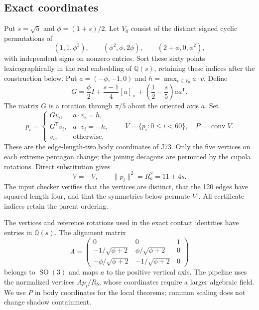 \documentclass[11pt]{amsart}
\newcommand{\Q}{\mathbb Q}
\newcommand{\SO}{\operatorname{SO}}
\newcommand{\conv}{\operatorname{conv}}
\newcommand{\norm}[1]{\lVert#1\rVert}
\newcommand{\cross}[1]{[#1]_\times}
\theoremstyle{definition}
\theoremstyle{remark}
\begin{document}
\subsection{Exact coordinates}
Put $s=\sqrt5$ and $\phi=(1+s)/2$. Let $V_0$ consist of the distinct signed
cyclic permutations of
\begin{equation}\label{eq:seeds}
 (1,1,\phi^3),\qquad (\phi^2,\phi,2\phi),\qquad
 (2+\phi,0,\phi^2),
\end{equation}
with independent signs on nonzero entries. Sort these sixty points
lexicographically in the real embedding of $\Q(s)$, retaining these
indices after the construction below. Put $a=(-\phi,-1,0)$ and
$h=\max_{v\in V_0}a\cdot v$. Define
\begin{equation}\label{eq:gyration}
 G=\frac\phi2 I+\frac{s-1}{4}\cross a
       +\left(\frac12-\frac{s}{5}\right)aa^{\mathsf T}.
\end{equation}
The matrix $G$ is a rotation through $\pi/5$ about the oriented axis $a$. Set
\begin{equation}\label{eq:body}
 p_i=\begin{cases}
 Gv_i,&a\cdot v_i=h,\\
 G^{\mathsf T}v_i,&a\cdot v_i=-h,\\
 v_i,&\text{otherwise},
 \end{cases}
 \qquad V=\{p_i:0\le i<60\},\quad P=\conv V.
\end{equation}
These are the edge-length-two body coordinates of J73. Only the five
vertices on each extreme pentagon change; the joining decagons are
permuted by the cupola rotations. Direct substitution gives
\begin{equation}\label{eq:bodychecks}
 V=-V,\qquad \norm{p_i}^2=R_b^2=11+4s.
\end{equation}
The input checker verifies that the vertices are distinct, that the 120
edges have squared length four, and that the symmetries below permute
$V$ \cite{input}. All certificate indices retain the parent ordering.

The vertices and reference rotations used in the exact contact identities
have entries in $\Q(s)$. The alignment matrix
\begin{equation}\label{eq:align}
 A=\begin{pmatrix}
 0&0&1\\
 -1/\sqrt{\phi+2}&\phi/\sqrt{\phi+2}&0\\
 -\phi/\sqrt{\phi+2}&-1/\sqrt{\phi+2}&0
 \end{pmatrix}
\end{equation}
belongs to $\SO(3)$ and maps $a$ to the positive vertical axis.
The pipeline uses the normalized vertices $Ap_i/R_b$, whose coordinates
require a larger algebraic field. We use $P$ in body coordinates for the local theorems; common
scaling does not change shadow containment.
\end{document}
